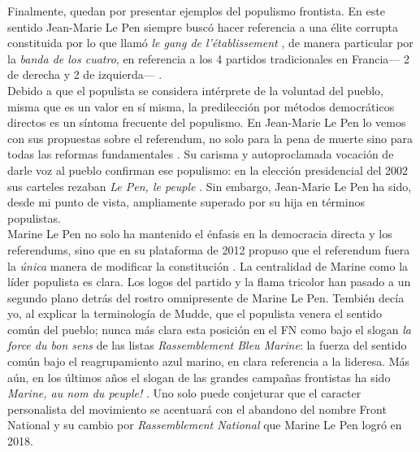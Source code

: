 Finalmente, quedan por presentar ejemplos del populismo frontista. En este sentido Jean-Marie Le Pen siempre buscó hacer referencia a una élite corrupta constituida por lo que llamó \textit{le gang de l'établissement} \parencite{Leprince16}, de manera particular por la \textit{banda de los cuatro}, en referencia a los 4 partidos tradicionales en Francia--- 2 de derecha y 2 de izquierda--- \parencite{Boily05}.\\ 

Debido a que el populista se considera intérprete de la voluntad del pueblo, misma que es un valor en sí misma, la predilección por métodos democráticos directos es un síntoma frecuente del populismo. En Jean-Marie Le Pen lo vemos con sus propuestas sobre el referendum, no solo para la pena de muerte sino para todas las reformas fundamentales \parencite{LObs07}. Su carisma y autoproclamada vocación de darle voz al pueblo confirman ese populismo: en la elección presidencial del 2002 sus carteles rezaban \textit{Le Pen, le peuple} \parencite{Gross16}. Sin embargo, Jean-Marie Le Pen ha sido, desde mi punto de vista, ampliamente superado por su hija en términos populistas.\\ 

Marine Le Pen no solo ha mantenido el énfasis en la democracia directa y los referendums, sino que en su plataforma de 2012 propuso que el referendum fuera la \textit{única} manera de modificar la constitución \parencite[énfasis mío]{LePen12}. La centralidad de Marine como la líder populista es clara. Los logos del partido y la flama tricolor han pasado a un segundo plano detrás del rostro omnipresente de Marine Le Pen. Tembién decía yo, al explicar la terminología de Mudde, que el populista venera el sentido común del pueblo; nunca más clara esta posición en el FN como bajo el slogan \textit{la force du bon sens} de las listas \textit{Rassemblement Bleu Marine}: la fuerza del sentido común bajo el reagrupamiento azul marino, en clara referencia a la lideresa. Más aún, en los últimos años el slogan de las grandes campañas frontistas ha sido \textit{Marine, au nom du peuple!} \parencite{Gross16}. Uno solo puede conjeturar que el caracter personalista del movimiento se acentuará con el abandono del nombre Front National y su cambio por \textit{Rassemblement National} que Marine Le Pen logró en 2018.